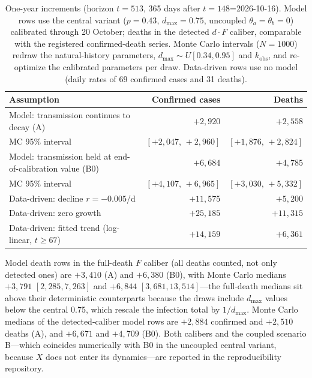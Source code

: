 \documentclass[10pt]{plos}
\begin{document}
\begin{table}[htbp]
\centering
\caption{One-year increments (horizon $t=513$, 365 days after
$t=148$=2026-10-16). Model rows use the central variant ($p=0.43$,
$d_{\max}=0.75$, uncoupled $\theta_a=\theta_b=0$) calibrated through
20 October; deaths in the detected
$d\cdot F$ caliber, comparable with the registered confirmed-death
series. Monte Carlo intervals ($N=1000$) redraw the natural-history
parameters, $d_{\max}\sim U[0.34,0.95]$ and $k_{\mathrm{obs}}$, and
re-optimize the calibrated parameters per draw. Data-driven rows use no
model (daily rates of 69 confirmed cases and 31 deaths).}
\label{tab:proj}
\begin{tabularx}{\textwidth}{Xrr}
\toprule
Assumption & Confirmed cases & Deaths \\
\midrule
Model: transmission continues to decay (A) & $+2{,}920$ & $+2{,}558$ \\
\quad MC 95\% interval & $[+2{,}047,\,+2{,}960]$ & $[+1{,}876,\,+2{,}824]$ \\
Model: transmission held at end-of-calibration value (B0) & $+6{,}684$ & $+4{,}785$ \\
\quad MC 95\% interval & $[+4{,}107,\,+6{,}965]$ & $[+3{,}030,\,+5{,}332]$ \\
Data-driven: decline $r=-0.005$/d & $+11{,}575$ & $+5{,}200$ \\
Data-driven: zero growth & $+25{,}185$ & $+11{,}315$ \\
Data-driven: fitted trend (log-linear, $t\ge67$) & $+14{,}159$ & $+6{,}361$ \\
\bottomrule
\end{tabularx}
\vspace{2pt}
\par\small Model death rows in the full-death $F$ caliber (all deaths
counted, not only detected ones) are $+3{,}410$ (A) and $+6{,}380$
(B0), with Monte Carlo medians $+3{,}791$ $[2{,}285,7{,}263]$ and
$+6{,}844$ $[3{,}681,13{,}514]$---the full-death medians sit above
their deterministic counterparts because the draws include $d_{\max}$
values below the central 0.75, which rescale the infection total by
$1/d_{\max}$. Monte Carlo medians of the detected-caliber model rows
are $+2{,}884$ confirmed and $+2{,}510$ deaths (A), and $+6{,}671$ and
$+4{,}709$ (B0). Both calibers and the coupled scenario B---which
coincides numerically with B0 in the uncoupled central variant, because
$X$ does not enter its dynamics---are reported in the reproducibility
repository.
\end{table}
\end{document}

